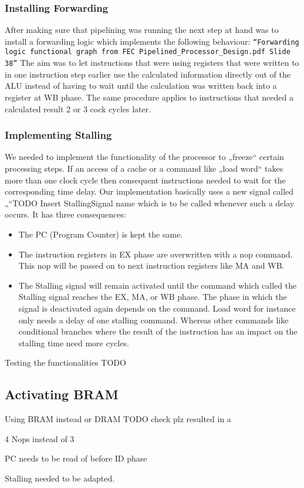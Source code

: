 \subsubsection{Installing Forwarding}
\label{sec:installingForwarding}

After making sure that pipelining was running the next step at hand was to install a forwarding logic which implements the following behaviour:
\texttt{``Forwarding logic functional graph from FEC \– Pipelined\_Processor\_Design.pdf Slide 38''}
The aim was to let instructions that were using registers that were written to in one instruction step earlier use the calculated information directly out of the ALU instead of having to wait until the calculation was written back into a register at WB phase.
The same procedure applies to instructions that needed a calculated result 2 or 3 cock cycles later.
 
\subsubsection{Implementing Stalling}
\label{sec:implementingStalling}

We needed to implement the functionality of the processor to „freeze“ certain processing steps. If an access of a cache or a command like „load word“ takes more than one clock cycle then consequent instructions needed to wait for the corresponding time delay. 
Our implementation basically uses a new signal called „“TODO Insert StallingSignal name which is to be called whenever such a delay occurs. It has three consequences:
\begin{itemize} 
	\item The PC (Program Counter) is kept the same.
	\item The instruction registers in EX phase are overwritten with a nop command. This nop will be passed on to next instruction registers like MA and WB.
	\item The Stalling signal will remain activated until the command which called the Stalling signal reaches the EX, MA, or WB phase. The phase in which the signal is deactivated again depends on the command. Load word for instance only needs a delay of one stalling command. Whereas other commands like conditional branches where the result of the instruction has an impact on the stalling time need more cycles.
\end{itemize}

Testing the functionalities TODO

\subsection{Activating BRAM}
\label{sec:activatingBRAM}

Using BRAM instead or DRAM  TODO check plz resulted in a  
	
4 Nops instead of 3

PC needs to be read of before ID phase

Stalling needed to be adapted.

